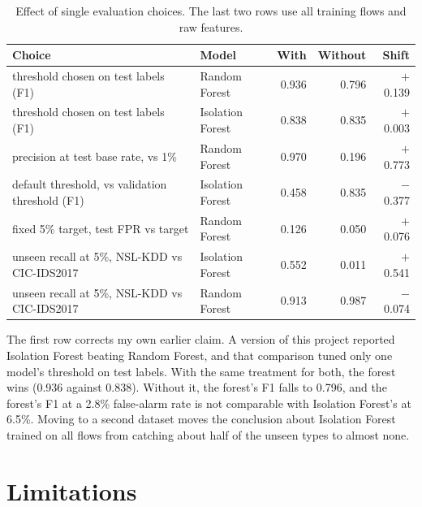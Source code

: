 \documentclass[10pt]{article}
\begin{document}
\begin{table}[t]
\centering\small
\begin{tabular}{llrrr}
\toprule
Choice & Model & With & Without & Shift\\
\midrule
threshold chosen on test labels (F1) & Random Forest & 0.936 & 0.796 & $+$0.139\\
threshold chosen on test labels (F1) & Isolation Forest & 0.838 & 0.835 & $+$0.003\\
precision at test base rate, vs 1\% & Random Forest & 0.970 & 0.196 & $+$0.773\\
default threshold, vs validation threshold (F1) & Isolation Forest & 0.458 & 0.835 & $-$0.377\\
fixed 5\% target, test FPR vs target & Random Forest & 0.126 & 0.050 & $+$0.076\\
unseen recall at 5\%, NSL-KDD vs CIC-IDS2017 & Isolation Forest & 0.552 & 0.011 & $+$0.541\\
unseen recall at 5\%, NSL-KDD vs CIC-IDS2017 & Random Forest & 0.913 & 0.987 & $-$0.074\\
\bottomrule
\end{tabular}
\caption{Effect of single evaluation choices. The last two rows use all training flows and raw features.}
\label{tab:pitfalls}
\end{table}

The first row corrects my own earlier claim. A version of this project reported Isolation Forest beating Random
Forest, and that comparison tuned only one model's threshold on test labels. With the same treatment for both, the forest wins (0.936
against 0.838). Without it, the forest's F1 falls to 0.796, and the forest's F1 at a 2.8\% false-alarm rate is
not comparable with Isolation Forest's at 6.5\%. Moving to a second dataset moves the conclusion about Isolation
Forest trained on all flows from catching about half of the unseen types to almost none.

\section{Limitations}
\end{document}
